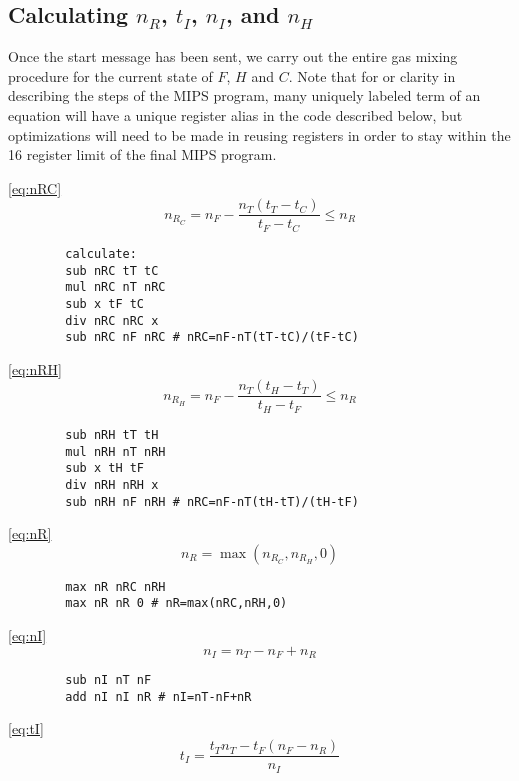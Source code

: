 \documentclass{article}
\begin{document}
\subsection{Calculating $n_R$, $t_I$, $n_I$, and $n_H$}

Once the start message has been sent, we carry out the entire
gas mixing procedure for the current state of $F$, $H$ and $C$.
Note that for or clarity in describing the steps of the MIPS program,
many uniquely labeled term of an equation will have a unique register alias
in the code described below, but optimizations will need to be made in
reusing registers in order to stay within the 16 register limit of the
final MIPS program.
\vspace{1em}
\begin{paracol}{2}
    \noindent
    \autoref{eq:nRC}
    \[
        n_{R_C} = n_F-\frac{n_T(t_T-t_C)}{t_F-t_C} \le n_R
    \]
    \switchcolumn
    \vspace{-1em}
    \begin{verbatim}
        calculate:
        sub nRC tT tC
        mul nRC nT nRC
        sub x tF tC
        div nRC nRC x
        sub nRC nF nRC # nRC=nF-nT(tT-tC)/(tF-tC)
    \end{verbatim}
    \switchcolumn*
    \noindent
    \autoref{eq:nRH}
    \[
        n_{R_H} = n_F-\frac{n_T(t_H-t_T)}{t_H-t_F} \le n_R
    \]
    \switchcolumn
    \vspace{-1em}
    \begin{verbatim}
        sub nRH tT tH
        mul nRH nT nRH
        sub x tH tF
        div nRH nRH x
        sub nRH nF nRH # nRC=nF-nT(tH-tT)/(tH-tF)
    \end{verbatim}
    \switchcolumn*
    \noindent
    \autoref{eq:nR}
    \[
        n_R = \max(n_{R_C},n_{R_H},0)
    \]
    \switchcolumn
    \vspace{-1em}
    \begin{verbatim}
        max nR nRC nRH
        max nR nR 0 # nR=max(nRC,nRH,0)
    \end{verbatim}
    \switchcolumn*
    \noindent
    \autoref{eq:nI}
    \[
        n_I = n_T-n_F+n_R
    \]
    \switchcolumn
    \vspace{-1em}
    \begin{verbatim}
        sub nI nT nF
        add nI nI nR # nI=nT-nF+nR
    \end{verbatim}
    \switchcolumn*
    \noindent
    \autoref{eq:tI}
    \[
        t_I = \frac{t_T n_T-t_F(n_F-n_R)}{n_I}
    \]

\end{paracol}
\end{document}
